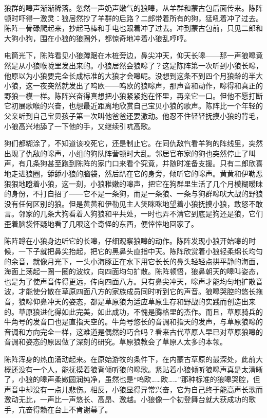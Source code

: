 \par 
\par 狼群的嗥声渐渐稀落。忽然一声奶声嫩气的狼嗥，从羊群和蒙古包后面传来。陈阵顿时吓得一激灵：狼居然抄了羊群的后路？二郎带着所有的狗，猛吼着冲了过去。陈阵一骨碌爬起来，抄起马棒和手电也跟着冲了过去。冲到蒙古包前，只见二郎和大狗小狗，围在小狼的狼圈外，都惊奇地冲着小狼乱哼哼。
\par 电筒光下，陈阵看见小狼蹲踞在木桩旁边，鼻尖冲天，仰天长嗥——那一声狼嗥竟然是从小狼喉咙里发出来的。小狼居然会狼嗥了？这是陈阵第一次听到小狼长嗥，他原以为小狼要完全长成标准的大狼才会嗥呢。没想到这条不到四个月狼龄的半大小狼，这一夜突然就发出了呜欧——呜欧的狼嗥声，那声音和动作，嗥得和真正的野狼一模一样。陈阵兴奋得真想把小狼紧紧抱在怀里，再亲它一口。但他不愿打断它初展歌喉的兴奋，也想最近距离地欣赏自己宝贝小狼的歌声。陈阵比一个年轻的父亲听到自己宝贝孩子第一次叫他爸爸还要激动。他忍不住轻轻抚摸小狼的背毛，小狼高兴地舔了一下他的手，又继续引吭高歌。
\par 狗们都糊涂了，不知道该咬死它，还是制止它。在同仇敌忾看羊狗的阵线里，突然出现了仇敌的嗥声，小组的狗队阵营顿时大乱。邻居官布家的狗也突然停止了叫声，有几条狗甚至跑到陈阵的家门口来看个究竟，并随时准备支援。只有二郎欣喜地走进狼圈，舔舔小狼的脑袋，然后趴在它的身旁，倾听它的嗥声。黄黄和伊勒恶狠狠地瞪着小狼，这一刻，小狼稚嫩的嗥声，把它在狗群里生活了几个月模糊暧昧的身份，不打自招了——它不是一条狗，而是一条狼、一条与狗群嗥吠大战的野狼没有任何区别的狼。但是黄黄和伊勒见主人笑眯眯地望着小狼抚摸小狼，敢怒不敢言。邻家的几条大狗看着人狗狼和平共处，一时也弄不清它到底是狗还是狼，它们歪着脑袋怀疑地看了几眼这个奇怪的东西，便悻悻地回家了。
\par 陈阵蹲在小狼身边听它的长嗥，仔细观察狼嗥的动作。陈阵发现小狼开始嗥的时候，一下子就把鼻尖抬起，把它的黑鼻头直指中天。陈阵欣赏着小狼轻柔绵长均匀的余音，就像月光下，一头小海豚正在水下用它长长的鼻头轻轻点拱平静的海面，海面上荡起一圈一圈的波纹，向四面均匀扩散。陈阵顿悟，狼鼻朝天的嗥叫姿态，也是为了使声音传得更远，传向四面八方。只有鼻尖冲天，嗥声才能均匀地扩散音波，才能使分散在草原四面八方的家族成员同时听到它的声音。狼嗥哭腔的悠长拖音，狼嗥仰鼻冲天的姿态，都是草原狼为适应草原生存和野战的实践而创造出来的。草原狼进化得如此完美，如此成功，不愧是腾格里的杰作。而且，草原骑兵的牛角号的发音口也是直指天空的。牛角号悠长的音调和指天的发声，与草原狼嗥的音调和方向完全一样，这难道是偶然的巧合吗？看来古代草原人早已对草原狼嗥的音调和姿态的原因做了深刻的研究。草原狼教会了草原人太多的本领。
\par 陈阵浑身的热血涌动起来。在原始游牧的条件下，在内蒙古草原的最深处，此前大概还没有一个人，能抚摸着狼背倾听狼的嗥歌。紧贴着小狼倾听狼嗥声真是太清晰了，小狼的嗥声柔嫩圆润纯净，虽然也是“呜欧……欧……”那种标准的狼嗥哭腔，但声音中却没有一点儿悲伤。相反，小狼显得异常兴奋，它为自己终于能高声长歌而激动无比，一声比一声悠长、高昂、激越。小狼像一个初登舞台就大获成功的歌手，亢奋得赖在台上不肯谢幕了。
